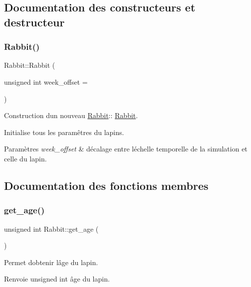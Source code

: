 \subsection{Documentation des constructeurs et destructeur}
\mbox{\label{classRabbit_aaddfbafa67919bec58e9a32e65946cd9}} 
\subsubsection{\texorpdfstring{Rabbit()}{Rabbit()}}
{\footnotesize\ttfamily Rabbit\+::\+Rabbit (\begin{DoxyParamCaption}\item[{unsigned int}]{week\+\_\+offset = {} }\end{DoxyParamCaption})}



Construction d\textquotesingle{}un nouveau \hyperlink{classRabbit}{Rabbit}\+:\+: \hyperlink{classRabbit}{Rabbit}. 

Initialise tous les paramêtres du lapins.


\begin{DoxyParams}{Paramètres}
{\em week\+\_\+offset} & décalage entre l\textquotesingle{}échelle temporelle de la simulation et celle du lapin. \\
\hline
\end{DoxyParams}


\subsection{Documentation des fonctions membres}
\mbox{\label{classRabbit_acf461328f7979c337f17d61fd6c6750b}} 
\subsubsection{\texorpdfstring{get\+\_\+age()}{get\_age()}}
{\footnotesize\ttfamily unsigned int Rabbit\+::get\+\_\+age (\begin{DoxyParamCaption}{ }\end{DoxyParamCaption})}



Permet d\textquotesingle{}obtenir l\textquotesingle{}âge du lapin. 

\begin{DoxyReturn}{Renvoie}
unsigned int âge du lapin. 
\end{DoxyReturn}
\mbox{\label{classRabbit_aedcad8063a668372630c56bdaf2520da}} 
